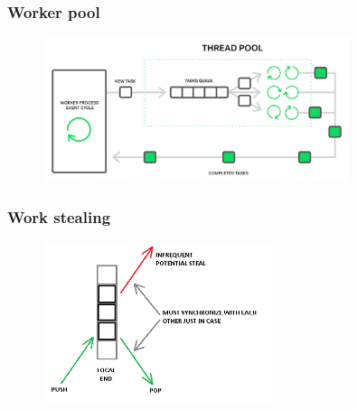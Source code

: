 \documentclass[aspectratio=169, pdf, 8pt, unicode]{beamer}
\begin{document}
\begin{frame}
\frametitle{Worker pool}
\begin{figure}[H]
\includegraphics[width=0.8\textwidth]{fig/thread-pools-worker-process-event-cycle.png}
\end{figure}
\end{frame}

\begin{frame}
\frametitle{Work stealing}
\begin{figure}[H]
\includegraphics[width=0.6\textwidth]{fig/stealing.png}
\end{figure}
\end{frame}
\end{document}
